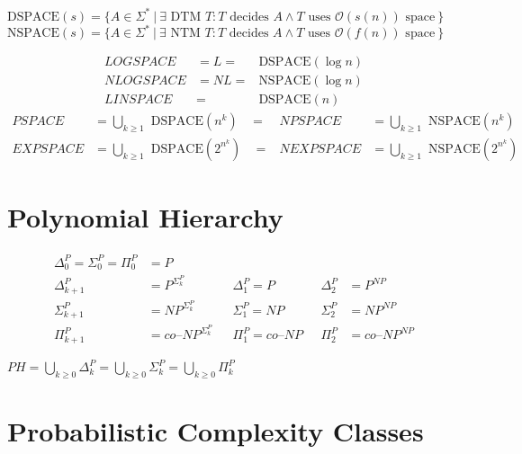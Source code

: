 \documentclass[
    13pt,
    oneside,
    a4paper,
    numbers=enddot,
    abstractoff,
    parskip=full
]{scrreprt}
\begin{document}
$\text{DSPACE}(s) = \{
    A \in \Sigma^\ast ~|~
    \exists \text{ DTM } T:
    T \text{ decides } A \land
    T \text{ uses } \mathcal{O}(s(n)) \text{ space}
~\}$
$\text{NSPACE}(s) = \{
    A \in \Sigma^\ast ~|~
    \exists \text{ NTM } T:
    T \text{ decides } A \land
    T \text{ uses } \mathcal{O}(f(n)) \text{ space}
~\}$


\begin{align*}
    LOGSPACE     &= L =& \text{DSPACE}(\log n)
    \\
    NLOGSPACE    &= NL =& \text{NSPACE}(\log n)
    \\
    LINSPACE     &=& \text{DSPACE}(n)
\end{align*}
\begin{align*}
        PSPACE          &= \bigcup_{k \geq 1} \text{ DSPACE}(n^k)
    ~~~~=&  NPSPACE     &= \bigcup_{k \geq 1} \text{ NSPACE}(n^k)
    \\
        EXPSPACE        &= \bigcup_{k \geq 1} \text{ DSPACE}(2^{n^k})
    ~~~~=&  NEXPSPACE   &= \bigcup_{k \geq 1} \text{ NSPACE}(2^{n^k})
\end{align*}






\section*{Polynomial Hierarchy}
\label{sec:polynomial_hierarchy}


\begin{align*}
    \Delta^P_0 = \Sigma^P_0 = \Pi^P_0 &= P
    \\
        \Delta^P_{k+1} &= P^{\Sigma^P_k}
    &&  \Delta^P_1 = P ~~~& \Delta^P_2 &= P^{NP}
    \\
        \Sigma^P_{k+1} &= NP^{\Sigma^P_k}
    &&  \Sigma^P_1 = NP ~~~& \Sigma^P_2 &= NP^{NP}
    \\
        \Pi^P_{k+1} &= co\text{--}NP^{\Sigma^P_k}
    &&  \Pi^P_1 = co\text{--}NP ~~~& \Pi^P_2 &= co\text{--}NP^{NP}
\end{align*}

$ PH = \bigcup_{k \geq 0} \Delta^P_{k}
     = \bigcup_{k \geq 0} \Sigma^P_{k}
     = \bigcup_{k \geq 0} \Pi^P_{k} $




\section*{Probabilistic Complexity Classes}
\label{sec:probabilistic_complexity_classes}
\end{document}
